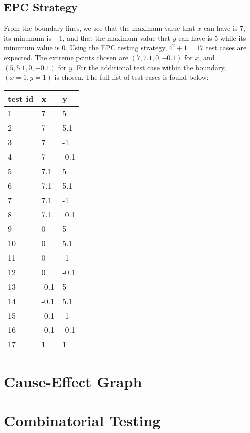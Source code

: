 \documentclass[letterpaper]{article}
\begin{document}
\subsection{EPC Strategy}
From the boundary lines, we see that the maximum value that $x$ can have is 
$7$, its minumum is $-1$, and that the maximum value that $y$ can have is
5 while its minumum value is 0. Using the EPC testing strategy, 
$4^2 + 1=17$ test cases are expected. The extreme points chosen are
$(7, 7.1, 0, -0.1)$ for $x$, and $(5, 5.1, 0, -0.1)$ for $y$.
For the additional test case within the boundary, $(x=1, y=1)$ is chosen.
The full list of test cases is found below:


\begin{adjustbox}{center}
	\begin{tabular}{lll}
		test id & x    & y    \\ \hline
1       & 7    & 5    \\
2       & 7    & 5.1  \\
3       & 7    & -1   \\
4       & 7    & -0.1 \\
5       & 7.1  & 5    \\
6       & 7.1  & 5.1  \\
7       & 7.1  & -1   \\
8       & 7.1  & -0.1 \\
9       & 0    & 5    \\
10      & 0    & 5.1  \\
11      & 0    & -1   \\
12      & 0    & -0.1 \\
13      & -0.1 & 5    \\
14      & -0.1 & 5.1  \\
15      & -0.1 & -1   \\
16      & -0.1 & -0.1 \\
17      & 1    & 1    \\
\end{tabular}
\end{adjustbox}
\section{Cause-Effect Graph}

\section{Combinatorial Testing}
\end{document}
